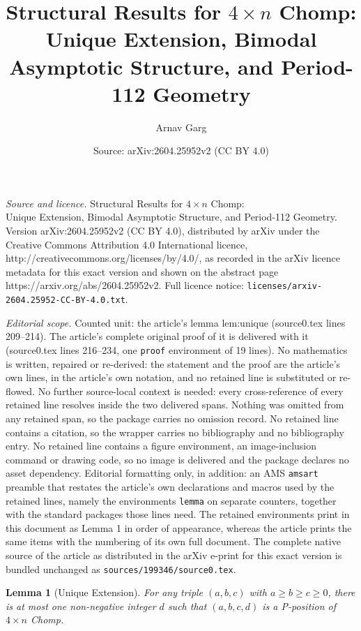 \documentclass[10pt,a4paper]{amsart}
\title{Structural Results for $4 \times n$ Chomp:\\ Unique Extension, Bimodal Asymptotic Structure, and Period-112 Geometry}
\author{Arnav Garg}
\date{Source: arXiv:2604.25952v2 (CC BY 4.0)}
\newtheorem{lemma}{Lemma}
\begin{document}
\maketitle

\noindent\emph{Source and licence.} Structural Results for $4 \times n$ Chomp:\\ Unique Extension, Bimodal Asymptotic Structure, and Period-112 Geometry. Version arXiv:2604.25952v2 (CC BY 4.0), distributed by arXiv under the Creative Commons Attribution 4.0 International licence, http://creativecommons.org/licenses/by/4.0/, as recorded in the arXiv licence metadata for this exact version and shown on the abstract page https://arxiv.org/abs/2604.25952v2. Full licence notice: \texttt{licenses/arxiv-2604.25952-CC-BY-4.0.txt}.\par\smallskip

\noindent\textit{Editorial scope.} Counted unit: the article's lemma lem:unique (source0.tex lines 209--214). The article's complete original proof of it is delivered with it (source0.tex lines 216--234, one \texttt{proof} environment of 19 lines). No mathematics is written, repaired or re-derived: the statement and the proof are the article's own lines, in the article's own notation, and no retained line is substituted or re-flowed.  No further source-local context is needed: every cross-reference of every retained line resolves inside the two delivered spans.  Nothing was omitted from any retained span, so the package carries no omission record.  No retained line contains a citation, so the wrapper carries no bibliography and no bibliography entry.  No retained line contains a figure environment, an image-inclusion command or drawing code, so no image is delivered and the package declares no asset dependency.  Editorial formatting only, in addition: an AMS \texttt{amsart} preamble that restates the article's own declarations and macros used by the retained lines, namely the environments \texttt{lemma} on separate counters, together with the standard packages those lines need.  The retained environments print in this document as Lemma 1 in order of appearance, whereas the article prints the same items with the numbering of its own full document.  The complete native source of the article as distributed in the arXiv e-print for this exact version is bundled unchanged as \texttt{sources/199346/source0.tex}.
\begin{lemma}[Unique Extension]
\label{lem:unique}
For any triple $(a, b, c)$ with $a \geq b \geq c \geq 0$, there is
at most one non-negative integer $d$ such that $(a, b, c, d)$ is a
P-position of $4 \times n$ Chomp.
\end{lemma}
\end{document}
